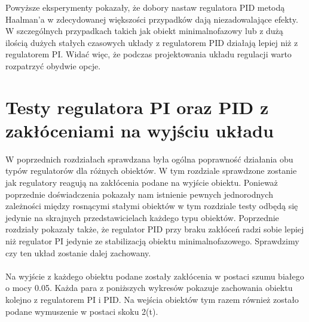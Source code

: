 \documentclass[10pt,a4paper]{article}
\begin{document}
Powyższe eksperymenty pokazały, że dobory nastaw regulatora PID metodą Haalman’a w zdecydowanej większości przypadków dają niezadowalające efekty.  W szczególnych przypadkach takich jak obiekt minimalnofazowy lub z dużą ilością dużych stałych czasowych układy z regulatorem PID działają lepiej niż z regulatorem PI. Widać więc, że podczas projektowania układu regulacji warto rozpatrzyć obydwie opcje. 
\newpage

\section{Testy regulatora PI oraz PID z zakłóceniami na wyjściu układu}

W poprzednich rozdziałach sprawdzana była ogólna poprawność działania obu typów regulatorów dla różnych obiektów. W tym rozdziale sprawdzone zostanie jak regulatory reagują na zakłócenia podane na wyjście obiektu. Ponieważ poprzednie doświadczenia pokazały nam istnienie pewnych jednorodnych zależności między rosnącymi stałymi obiektów w tym rozdziale testy odbędą się jedynie na skrajnych przedstawicielach każdego typu obiektów. Poprzednie rozdziały pokazały także, że regulator PID przy braku zakłóceń radzi sobie lepiej niż regulator PI jedynie ze stabilizacją obiektu minimalnofazowego. Sprawdzimy czy ten układ zostanie dalej zachowany.\\\\
Na wyjście z każdego obiektu podane zostały zakłócenia w postaci szumu białego o mocy 0.05. Każda para z poniższych wykresów pokazuje zachowania obiektu kolejno z regulatorem PI i PID. Na wejścia obiektów tym razem również zostało podane wymuszenie w postaci skoku 2(t).
  
\newpage
\end{document}
